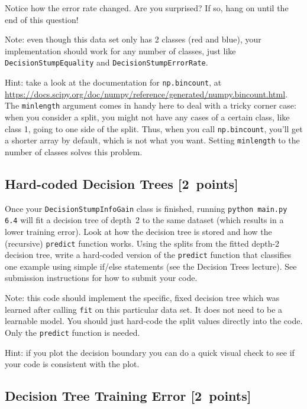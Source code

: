\documentclass{article}
\newcommand{\blu}[1]{{\textcolor{blu}{#1}}}
\let\ask\blu
\newcommand\pts[1]{\textcolor{pointscolour}{[#1~points]}}
\begin{document}
  Notice how the error rate changed. Are you surprised? If so, hang on until the end of this question!

  Note: even though this data set only has 2 classes (red and blue), your implementation should work
  for any number of classes, just like \texttt{DecisionStumpEquality} and \texttt{DecisionStumpErrorRate}.

  Hint: take a look at the documentation for \texttt{np.bincount}, at \\
  \url{https://docs.scipy.org/doc/numpy/reference/generated/numpy.bincount.html}.
  The \texttt{minlength} argument comes in handy here to deal with a tricky corner case:
  when you consider a split, you might not have any cases of a certain class, like class 1,
  going to one side of the split. Thus, when you call \texttt{np.bincount}, you'll get
  a shorter array by default, which is not what you want. Setting \texttt{minlength} to the
  number of classes solves this problem.


  \subsection{Hard-coded Decision Trees \pts{2}}

  Once your \texttt{DecisionStumpInfoGain} class is finished, running \texttt{python main.py 6.4} will fit
  a decision tree of depth~2 to the same dataset (which results in a lower training error).
  Look at how the decision tree is stored and how the (recursive) \texttt{predict} function works.
  \ask{Using the splits from the fitted depth-2 decision tree, write a hard-coded version of the \texttt{predict}
  function that classifies one example using simple if/else statements
  (see the Decision Trees lecture). See submission instructions for how to submit your code.}

  Note: this code should implement the specific, fixed decision tree
  which was learned after calling \texttt{fit} on this particular data set. It does not need to be a learnable model.
  You should just hard-code the split values directly into the code.
  Only the \texttt{predict} function is needed.

  Hint: if you plot the decision boundary you can do a quick visual check to see if your code is consistent with the plot.



  \subsection{Decision Tree Training Error \pts{2}}
\end{document}

